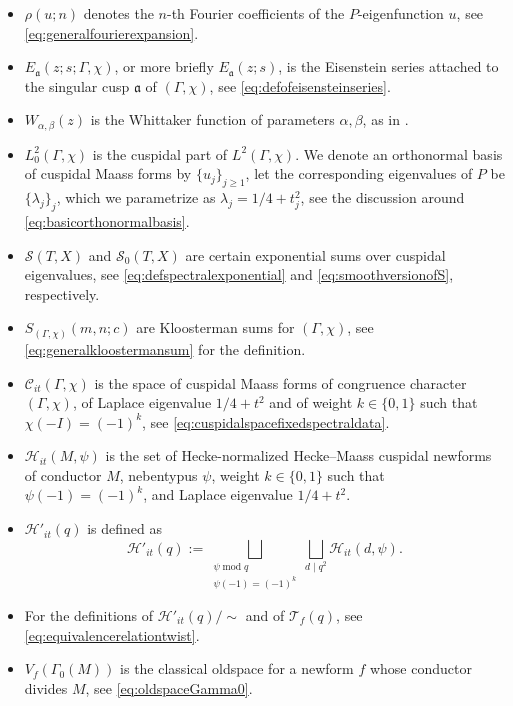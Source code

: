 \documentclass{article}
\theoremstyle{named}
\newcommand{\C}{\mathcal{C}}
\newcommand{\HH}{\mathcal{H}}
\renewcommand{\S}{\mathcal{S}}
\newcommand{\T}{\mathcal{T}}
\renewcommand{\a}{\mathfrak{a}}
\DeclareMathOperator{\modulo}{mod}
\begin{document}
\begin{itemize}
    \item $\rho(u; n)$ denotes the $n$-th Fourier coefficients of the $P$-eigenfunction $u$, see \eqref{eq:generalfourierexpansion}.
    \item $E_\a(z; s; \Gamma, \chi)$, or more briefly $E_\a(z; s)$, is the Eisenstein series attached to the singular cusp $\a$ of $(\Gamma, \chi)$, see \eqref{eq:defofeisensteinseries}.
    \item $W_{\alpha, \beta}(z)$ is the Whittaker function of parameters $\alpha, \beta$, as in \cite[Equation (4.19)]{DFIsubconvexityartin}.
    \item $L_0^2(\Gamma, \chi)$ is the cuspidal part of $L^2(\Gamma, \chi)$. We denote an orthonormal basis of cuspidal Maass forms by $\{u_j\}_{j \geq 1}$, let the corresponding eigenvalues of $P$ be $\{\lambda_j\}_j$, which we parametrize as $\lambda_j = 1/4 + t_j^2$, see the discussion around \eqref{eq:basicorthonormalbasis}.
    \item $\S(T, X)$ and $\S_0(T, X)$ are certain exponential sums over cuspidal eigenvalues, see \eqref{eq:defspectralexponential} and \eqref{eq:smoothversionofS}, respectively.
    \item $S_{(\Gamma, \chi)}(m, n; c)$ are Kloosterman sums for $(\Gamma, \chi)$, see \eqref{eq:generalkloostermansum} for the definition.
    \item $\C_{it}(\Gamma, \chi)$ is the space of cuspidal Maass forms of congruence character $(\Gamma, \chi)$, of Laplace eigenvalue $1/4 + t^2$ and of weight $k \in \{0, 1\}$ such that $\chi(-I) = (-1)^k$, see \eqref{eq:cuspidalspacefixedspectraldata}.
    \item $\HH_{it}(M, \psi)$ is the set of Hecke-normalized Hecke--Maass cuspidal newforms of conductor $M$, nebentypus $\psi$, weight $k \in \{0, 1\}$ such that $\psi(-1) = (-1)^k$, and Laplace eigenvalue $1/4 + t^2$. 
    \item $\HH'_{it}(q)$ is defined as 
    \begin{equation*}
        \HH'_{it}(q) := \bigsqcup_{\substack{\psi \modulo q\\
\psi(-1) = (-1)^k}} \bigsqcup_{d \mid q^2} \HH_{it}(d, \psi).
    \end{equation*}
    \item For the definitions of $\HH'_{it}(q)/\sim$ and of $\T_f(q)$, see \eqref{eq:equivalencerelationtwist}.  
    \item $V_f(\Gamma_0(M))$ is the classical oldspace for a newform $f$ whose conductor divides $M$, see \eqref{eq:oldspaceGamma0}.

\end{itemize}
\end{document}
